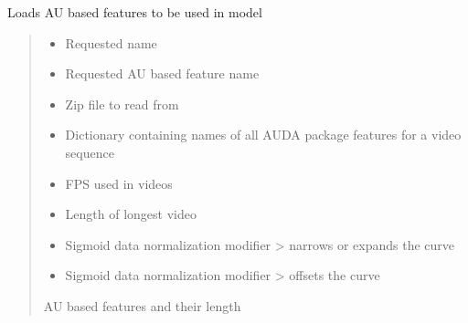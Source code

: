 \documentclass[letterpaper,10pt,english]{sphinxmanual}
\begin{document}
\begin{fulllineitems}
\label{\detokenize{dataset:dataset.load_features_aus}}
\pysigstartsignatures
{}
\pysigstopsignatures
\sphinxAtStartPar
Loads AU based features to be used in model
\begin{quote}\begin{description}
\begin{itemize}
\item {} 
\sphinxAtStartPar
{} \textendash{} Requested name

\item {} 
\sphinxAtStartPar
{} \textendash{} Requested AU based feature name

\item {} 
\sphinxAtStartPar
{} \textendash{} Zip file to read from

\item {} 
\sphinxAtStartPar
{} \textendash{} Dictionary containing names of all AUDA package features for a video sequence

\item {} 
\sphinxAtStartPar
{} \textendash{} FPS used in videos

\item {} 
\sphinxAtStartPar
{} \textendash{} Length of longest video

\item {} 
\sphinxAtStartPar
{} \textendash{} Sigmoid data normalization modifier \sphinxhyphen{}\textgreater{} narrows or expands the curve

\item {} 
\sphinxAtStartPar
{} \textendash{} Sigmoid data normalization modifier \sphinxhyphen{}\textgreater{} offsets the curve

\end{itemize}

\sphinxAtStartPar
AU based features and their length

\end{description}\end{quote}

\end{fulllineitems}
\end{document}
